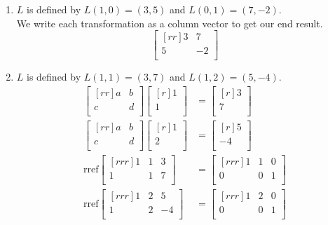 \documentclass[12pt]{article}
\theoremstyle{definition}
\theoremstyle{plain}
\begin{document}
\begin{enumerate}
\begin{enumerate}
	\item $L$ is defined by $L(1,0)=(3,5)$ and $L(0,1)=(7,-2)$.\\
		We write each transformation as a column vector to get our end result.
		\[ \begin{bmatrix}[rr]3&7\\5&-2\\\end{bmatrix} \]
	\item $L$ is defined by $L(1,1)=(3,7)$ and $L(1,2)=(5,-4)$.\\
		\begin{align*}
		\begin{bmatrix}[rr]a&b\\c&d\\\end{bmatrix}\begin{bmatrix}[r]1\\1\\\end{bmatrix} &= \begin{bmatrix}[r]3\\7\\\end{bmatrix}\\
		\begin{bmatrix}[rr]a&b\\c&d\\\end{bmatrix}\begin{bmatrix}[r]1\\2\\\end{bmatrix} &= \begin{bmatrix}[r]5\\-4\\\end{bmatrix}\\
		\mathrm{rref}\begin{bmatrix}[rrr]1&1&3\\1&1&7\\\end{bmatrix}&=\begin{bmatrix}[rrr]1&1&0\\0&0&1\\\end{bmatrix}\\
		\mathrm{rref}\begin{bmatrix}[rrr]1&2&5\\1&2&-4\\\end{bmatrix} &= \begin{bmatrix}[rrr]1&2&0\\0&0&1\\\end{bmatrix}

\end{align*}
\end{enumerate}
\end{enumerate}
\end{document}
